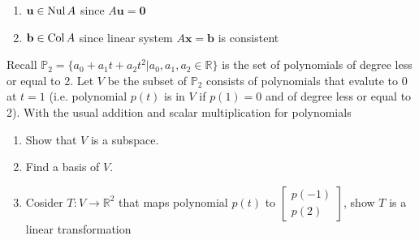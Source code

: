 \documentclass[a4paper,10pt]{article}
\begin{document}
\begin{solution}
\begin{enumerate}[label=\alph*)]
\item $\mathbf u\in\operatorname{Nul} A$ since $A\mathbf u=\mathbf0$
\item $\mathbf b\in\operatorname{Col} A$ since linear system $A\mathbf x=\mathbf b$ is consistent
\end{enumerate}
\end{solution}

\begin{problem}
Recall $\mathbb P_2=\{a_0+a_1t+a_2t^2|a_0,a_1,a_2\in\mathbb R\}$ is the set of polynomials of degree less or equal to 2. Let $V$ be the subset of $\mathbb P_2$ consists of polynomials that evalute to 0 at $t=1$ (i.e. polynomial $p(t)$ is in $V$ if $p(1)=0$ and of degree less or equal to 2). With the usual addition and scalar multiplication for polynomials
\begin{enumerate}[label=\alph*)]
\item Show that $V$ is a subspace.
\item Find a basis of $V$.
\item Cosider $T:V\to\mathbb R^2$ that maps polynomial $p(t)$ to $\begin{bmatrix}
p(-1)\\p(2)
\end{bmatrix}$, show $T$ is a linear transformation
\end{enumerate}
\end{problem}
\end{document}
